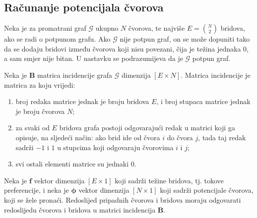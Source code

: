 \documentclass[lmodern, utf8, diplomski, numeric]{fer}
\newcommand{\matr}[1]{\mathbold{#1}}
\newcommand{\graph}[1]{\mathcal{#1}}
\newcommand{\q}{\left}
\newcommand{\w}{\right}
\begin{document}
  \subsection{Računanje potencijala čvorova}
  \label{sub:potential}
  Neka je za promatrani graf $\graph{G}$ ukupno $N$ čvorova, te najviše $E = \binom{N}{2}$ bridova, ako se radi o potpunom grafu.
  Ako $\graph{G}$ nije potpun graf, on se može dopuniti tako da se dodaju bridovi između čvorova koji nisu povezani, čija je težina jednaka 0, a sam smjer nije bitan.
  U nastavku se podrazumijeva da je $\graph{G}$ potpun graf.
  
  Neka je $\matr{B}$ matrica incidencije grafa $\graph{G}$ dimenzija $\q[E \times N\w]$.
  Matrica incidencije je matrica za koju vrijedi:
  \begin{enumerate}
    \item broj redaka matrice jednak je broju bridova $E$, i broj stupaca matrice jednak je broju čvorova $N$;
    \item za svaki od $E$ bridova grafa postoji odgovarajući redak u matrici koji ga opisuje, na sljedeći način: ako brid ide od čvora $i$ do čvora $j$, tada taj redak sadrži $-1$ i $1$ u stupcima koji odgovaraju čvorovima $i$ i $j$;
    \item svi ostali elementi matrice su jednaki 0.
  \end{enumerate}
  Neka je $\matr{f}$ vektor dimenzija $\q[E \times 1\w]$ koji sadrži težine bridova, tj. tokove preferencije,
  i neka je $\matr{\phi}$ vektor dimenzija $\q[N \times 1\w]$ koji sadrži potencijale čvorova, koji se žele pronaći.
  Redoslijed pripadnih čvorova i bridova moraju odgovarati redoslijedu čvorova i bridova u matrici incidencija $\matr{B}$.
  
\end{document}
